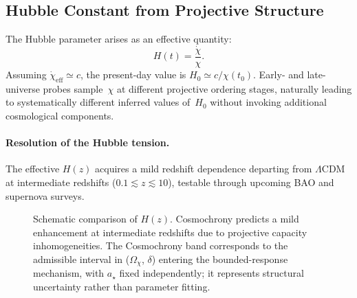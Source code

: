 \subsection{Hubble Constant from Projective Structure}
  \label{subsec:hubble-constant-from-chi-dynamics}

  The Hubble parameter arises as an effective quantity:
  \begin{equation}
    H(t) = \frac{\dot{\chi}}{\chi}.
  \end{equation}
  Assuming $\dot{\chi}_{\mathrm{eff}} \simeq c$, the present-day value is
  $H_0 \simeq c/\chi(t_0)$.
  Early- and late-universe probes sample~$\chi$ at different projective ordering stages,
  naturally leading to systematically different inferred values
  of~$H_0$ without invoking additional cosmological components.

  \paragraph{Resolution of the Hubble tension.}
    The effective $H(z)$ acquires a mild redshift dependence departing from
    $\Lambda$CDM at intermediate redshifts
    ($0.1 \lesssim z \lesssim 10$), testable through upcoming BAO and
    supernova surveys.

    \begin{figure}[t]
      \centering
      \caption{Schematic comparison of $H(z)$.
      Cosmochrony predicts a mild enhancement at intermediate
      redshifts due to projective capacity inhomogeneities.
      The Cosmochrony band corresponds to the admissible interval in
        ($\Omega_{\chi}$, $\delta$) entering the bounded-response mechanism,
        with $a_{\star}$ fixed independently; it represents structural uncertainty
        rather than parameter fitting.}
      \label{fig:hubble-comparison}
    \end{figure}
